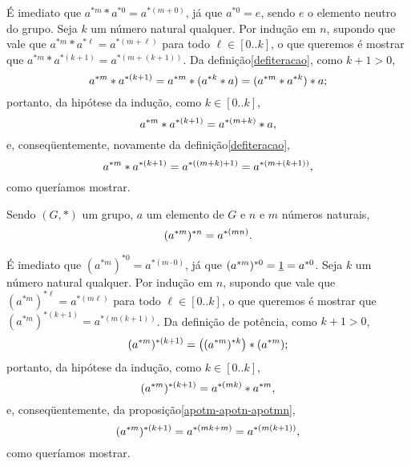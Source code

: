 \begin{dem}
  É imediato que $a^{\ast m}\ast a^{\ast 0} = a^{\ast (m+0)}$, já que
  $a^{\ast 0} = e$, sendo $e$ o elemento neutro do grupo. Seja $k$ um
  número natural qualquer. Por indução em $n$, supondo que vale que
  $a^{\ast m}\ast a^{\ast\ell} = a^{\ast (m+\ell)}$ para todo
  $\ell\in[0..k]$,
  o que queremos é mostrar que $a^{\ast m}\ast a^{\ast(k+1)}
  = a^{\ast(m+(k+1))}$. Da
  definição\xspace\ref{defiteracao},
  como $k+1>0$,
  \begin{equation*}
    a^{\ast m}\ast a^{\ast(k+1)} = a^{\ast m}\ast(a^{\ast k}\ast a)
    = (a^{\ast m}\ast a^{\ast k})\ast a\mathrm{;}
  \end{equation*}
  portanto, da hipótese da indução, como $k\in[0..k]$,
  \begin{equation*}
    a^{\ast m}\ast a^{\ast(k+1)} = a^{\ast(m+k)}\ast a\mathrm{,}
  \end{equation*}
  e, conseqüentemente, novamente da definição\xspace\ref{defiteracao},
  \begin{equation*}
    a^{\ast m}\ast a^{\ast(k+1)} = a^{\ast((m+k)+1)}
    = a^{\ast(m+(k+1))}\mathrm{,}
  \end{equation*}
  como queríamos mostrar.
\end{dem}

\begin{Propr}\label{proprpotmnpotmn}
  Sendo $(G,\ast)$ um grupo, $a$ um elemento de $G$ e
  $n$ e $m$ números naturais,
  \begin{equation*}
    (a^{\ast m})^{\ast n} = a^{\ast(mn)}\mathrm{.}
  \end{equation*}
\end{Propr}

\begin{dem}
  É imediato que $(a^{\ast m})^{\ast 0} = a^{\ast(m\cdot 0)}$,
  já que $(a^{\ast m})^{\ast 0} = \underline{1} = a^{\ast 0}$.
  Seja $k$ um
  número natural qualquer. Por indução em $n$, supondo que vale que
  $(a^{\ast m})^{\ast \ell} = a^{\ast (m\ell)}$ para todo
  $\ell\in[0..k]$,
  o que queremos é mostrar que $(a^{\ast m})^{\ast(k+1)}
  = a^{\ast(m(k+1))}$. Da definição
  de potência, como $k+1>0$,
  \begin{equation*}
    (a^{\ast m})^{\ast(k+1)} =
    \bigl((a^{\ast m})^{\ast k}\bigr)\ast(a^{\ast m})\mathrm{;}
  \end{equation*}
  portanto, da hipótese da indução, como $k\in[0..k]$,
  \begin{equation*}
    (a^{\ast m})^{\ast(k+1)} = a^{\ast(mk)}\ast a^{\ast m}\mathrm{,}
  \end{equation*}
  e, conseqüentemente, da proposição\xspace\ref{apotm-apotn-apotmn},
  \begin{equation*}
    (a^{\ast m})^{\ast(k+1)} = a^{\ast(mk+m)} = a^{\ast(m(k+1))}\mathrm{,}
  \end{equation*}
  como queríamos mostrar.
\end{dem}

